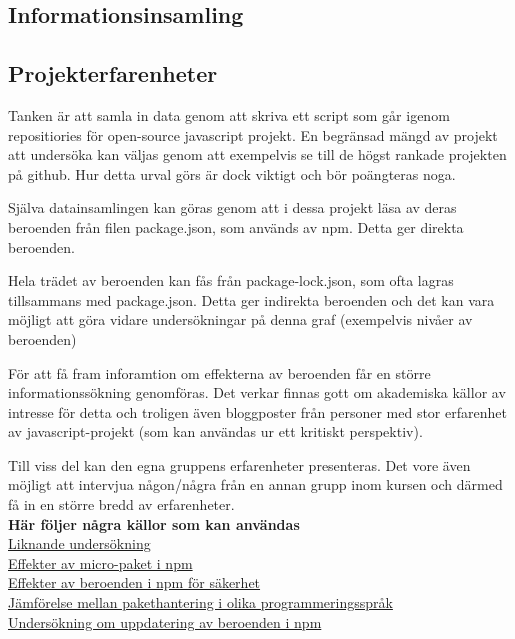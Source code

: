 \subsection{Informationsinsamling}

\subsection{Projekterfarenheter}

Tanken är att samla in data genom att skriva ett script som går igenom repositiories för open-source javascript projekt. En begränsad mängd av projekt att undersöka kan väljas genom att exempelvis se till de högst rankade projekten på github. Hur detta urval görs är dock viktigt och bör poängteras noga.

Själva datainsamlingen kan göras genom att i dessa  projekt läsa av deras beroenden från filen package.json, som används av npm. Detta ger direkta beroenden.

Hela trädet av beroenden kan fås från package-lock.json, som ofta lagras tillsammans med package.json. Detta ger indirekta beroenden och det kan vara möjligt att göra vidare undersökningar på denna graf (exempelvis nivåer av beroenden)

För att få fram inforamtion om effekterna av beroenden får en större informationssökning genomföras. Det verkar finnas gott om akademiska källor av intresse för detta och troligen även bloggposter från personer med stor erfarenhet av javascript-projekt (som kan användas ur ett kritiskt perspektiv).

Till viss del kan den egna gruppens erfarenheter presenteras. Det vore även möjligt att intervjua någon/några från en annan grupp inom kursen och därmed få in en större bredd av erfarenheter.\\

\textbf{Här följer några källor som kan användas}\\
\href{https://dspace.cvut.cz/bitstream/handle/10467/68195/F8-DP-2017-Zitny-Jakub-thesis.pdf?sequence=1&isAllowed=y}{Liknande undersökning}\\
\href{https://arxiv.org/pdf/1709.04638.pdf}{Effekter av micro-paket i npm}\\
\href{https://repository.tudelft.nl/islandora/object/uuid:3a15293b-16f6-4e9d-b6a2-f02cd52f1a9e?collection=education}{Effekter av beroenden i npm för säkerhet}\\ \href{https://arxiv.org/pdf/1710.04936.pdf}{Jämförelse mellan pakethantering i olika programmeringsspråk}\\ \href{http://www.scotthenry.ca/wp-content/uploads/2018/01/Report.pdf}{Undersökning om uppdatering av beroenden i npm}\\
